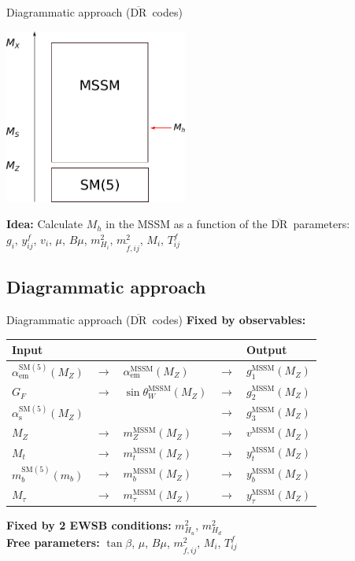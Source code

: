 \documentclass[hyperref={pdfpagelabels=false},ngerman]{beamer}
\renewcommand{\emph}{\textbf}
\newcommand{\DRbar}{\ensuremath{\overline{\text{DR}}}}
\newcommand{\SM}{\ensuremath{\text{SM}}}
\newcommand{\MSSM}{\ensuremath{\text{MSSM}}}
\begin{document}
\begin{frame}{Diagrammatic approach (\DRbar\ codes)}
  \begin{center}
    \includegraphics[width=0.45\textwidth]{images/mssm-sm-tower-diagrammatic}\\[1em]
  \end{center}
  \emph{Idea:} Calculate $M_h$ in the MSSM as a function of the \DRbar\ parameters:\\[1em]
  \centering $g_i$, $y^f_{ij}$, $v_i$, $\mu$, $B\mu$, $m^2_{H_i}$,
  $m_{\tilde{f},ij}^2$, $M_i$, $T^f_{ij}$
\end{frame}

\subsection{Diagrammatic approach}

\begin{frame}{Diagrammatic approach (\DRbar\ codes)}
  \emph{Fixed by observables:}
  \begin{table}
    \centering
    \begin{tabular}{lllll}
      Input & & & & Output \\
      \midrule
      $\alpha_\text{em}^{\SM(5)}(M_Z)$ & $\rightarrow$ & $\alpha_\text{em}^\MSSM(M_Z)$ & $\rightarrow$ & $g_1^\MSSM(M_Z)$ \\
      $G_F$ & $\rightarrow$ & $\sin\theta_W^\MSSM(M_Z)$ & $\rightarrow$ & $g_2^\MSSM(M_Z)$ \\
      $\alpha_\text{s}^{\SM(5)}(M_Z)$ & & & $\rightarrow$ & $g_3^\MSSM(M_Z)$ \\
      $M_Z$ & $\rightarrow$ & $m_Z^\MSSM(M_Z)$ & $\rightarrow$ & $v^\MSSM(M_Z)$ \\
      $M_t$ & $\rightarrow$ & $m_t^\MSSM(M_Z)$ & $\rightarrow$ & $y_t^\MSSM(M_Z)$ \\
      $m_b^{\SM(5)}(m_b)$ & $\rightarrow$ & $m_b^\MSSM(M_Z)$ & $\rightarrow$ & $y_b^\MSSM(M_Z)$ \\
      $M_\tau$ & $\rightarrow$ & $m_\tau^\MSSM(M_Z)$ & $\rightarrow$ & $y_\tau^\MSSM(M_Z)$ \\
    \end{tabular}
  \end{table}
  \emph{Fixed by 2 EWSB conditions:} $m^2_{H_u}$, $m^2_{H_d}$ \\[1em]
  \emph{Free parameters:} $\tan\beta$, $\mu$, $B\mu$, $m_{\tilde{f},ij}^2$, $M_i$,
  $T^f_{ij}$
\end{frame}
\end{document}
